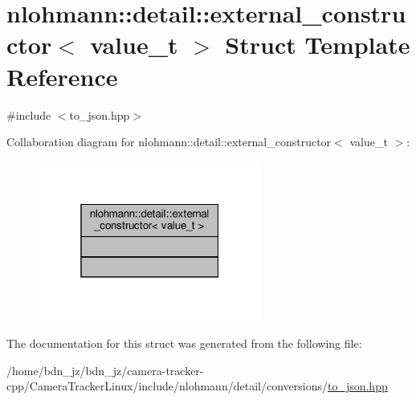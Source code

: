\hypertarget{structnlohmann_1_1detail_1_1external__constructor}{}\section{nlohmann\+:\+:detail\+:\+:external\+\_\+constructor$<$ value\+\_\+t $>$ Struct Template Reference}
\label{structnlohmann_1_1detail_1_1external__constructor}


{\ttfamily \#include $<$to\+\_\+json.\+hpp$>$}



Collaboration diagram for nlohmann\+:\+:detail\+:\+:external\+\_\+constructor$<$ value\+\_\+t $>$\+:
\nopagebreak
\begin{figure}[H]
\begin{center}
\leavevmode
\includegraphics[width=208pt]{structnlohmann_1_1detail_1_1external__constructor__coll__graph}
\end{center}
\end{figure}


The documentation for this struct was generated from the following file\+:\begin{DoxyCompactItemize}
\item 
/home/bdn\+\_\+jz/bdn\+\_\+jz/camera-\/tracker-\/cpp/\+Camera\+Tracker\+Linux/include/nlohmann/detail/conversions/\hyperlink{to__json_8hpp}{to\+\_\+json.\+hpp}\end{DoxyCompactItemize}
